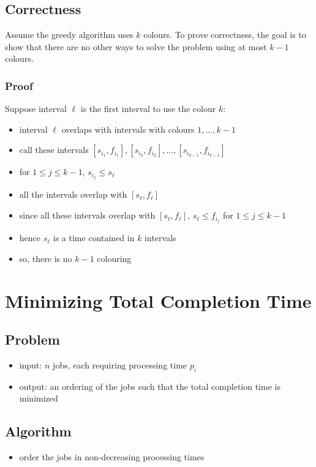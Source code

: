 \documentclass[11pt]{article}
\begin{document}
\subsection{Correctness}
\label{sec:org7290112}
Assume the greedy algorithm uses \(k\) colours.
To prove correctness, the goal is to show that there are no other ways to solve
the problem using at most \(k-1\) colours.
\subsubsection{Proof}
\label{sec:orgb4ddd45}
Suppose interval \(\ell\) is the first interval to use the colour \(k\):
\begin{itemize}
\item interval \(\ell\) overlaps with intervals with colours \(1, \dots, k - 1\)
\item call these intervals
\([s_{i_{1}}, f_{i_{1}}], [s_{i_{2}}, f_{i_{2}}], \dots, [s_{i_{k-1}}, f_{i_{k-1}}]\)
\item for \(1 \le j \le k-1\), \(s_{i_{j}} \le s_{\ell}\)
\item all the intervals overlap with \([s_{\ell}, f_{\ell}]\)
\item since all these intervals overlap with \([s_{\ell}, f_{\ell}]\),
\(s_{\ell} \le f_{i_{j}}\) for \(1 \le j \le k-1\)
\item hence \(s_{\ell}\) is a time contained in \(k\) intervals
\item so, there is no \(k-1\) colouring
\end{itemize}
\section{Minimizing Total Completion Time}
\label{sec:orgbadfc34}
\subsection{Problem}
\label{sec:org5819e10}
\begin{itemize}
\item input: \(n\) jobs, each requiring processing time \(p_{i}\)
\item output: an ordering of the jobs such that the total completion time is minimized
\end{itemize}
\subsection{Algorithm}
\label{sec:orgbba33aa}
\begin{itemize}
\item order the jobs in non-decreasing processing times
\end{itemize}
\end{document}
